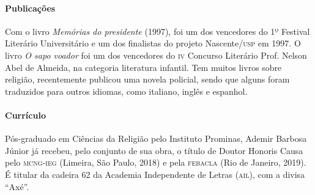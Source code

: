 \documentclass[11pt]{extarticle}
\begin{document}
\reversemarginpar
\marginparwidth=5cm



\paragraph{Publicações} Com o livro \textit{Memórias do presidente} (1997), foi um dos vencedores do 1º Festival Literário Universitário e um dos finalistas do projeto Nascente/\textsc{usp} em 1997. O livro \textit{O sapo voador} foi um dos vencedores do \textsc{iv} Concurso Literário Prof. Nelson Abel de Almeida, na categoria literatura infantil. Tem muitos livros sobre religião, recentemente publicou uma novela policial, sendo que alguns foram traduzidos para outros idiomas, como italiano, inglês e espanhol.

\paragraph{Currículo} Pós-graduado em Ciências da Religião pelo Instituto Prominas, Ademir Barbosa Júnior já recebeu, pelo conjunto de sua obra, o título de Doutor Honoris Causa pelo \textsc{mcng-ieg} (Limeira, São Paulo, 2018) e pela \textsc{febacla} (Rio de Janeiro, 2019). É titular da cadeira 62 da Academia Independente de Letras (\textsc{ail}), com a divisa ``Axé''.
 
\end{document}
